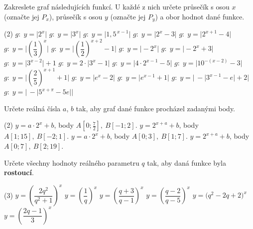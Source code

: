 \documentclass[12pt,a4paper]{article}
\begin{document}
\begin{exercise}

Zakreslete graf následujících funkcí. 
U každé z nich určete průsečík s osou $x$ (označte jej $P_{x}$),
průsečík s osou $y$ (označte jej $P_{y}$) a obor hodnot dané funkce.

\begin{tasks}(2)
    \task $g:\; y = \bigl|2^{x}\bigr|$
    \task $g:\; y = \bigl|3^{x}\bigr|$
    \task $g:\; y = \bigl|1{,}5^{\,x-1}\bigr|$
    \task $g:\; y = \bigl|2^{x} - 3\bigr|$
    \task $g:\; y = \bigl|2^{x+1} - 4\bigr|$
    \task $g:\; y = \biggl|\left(\dfrac{1}{3}\right)^{x}\biggr|$
    \task $g:\; y = \biggl|\left(\dfrac{1}{2}\right)^{x+2} - 1\biggr|$
    \task $g:\; y = \bigl|-2^{x}\bigr|$
    \task $g:\; y = \bigl|-2^{x} + 3\bigr|$
    \task $g:\; y = \bigl|3^{x-2}\bigr| + 1$
    \task $g:\; y = 2\cdot\bigl|3^{x} - 1\bigr|$
    \task $g:\; y = \bigl|4\cdot 2^{x-1} - 5\bigr|$
    \task $g:\; y = \biggl|10^{-(x-2)} - 3\biggr|$
    \task $g:\; y = \biggl|\left(\dfrac{2}{5}\right)^{x+1} + 1\biggr|$
    \task $g:\; y = \bigl|e^{x} - 2\bigr|$
    \task $g:\; y = \bigl|e^{x-1} + 1\bigr|$
    \task $g:\; y = \bigl|\,-\bigl|3^{x-1} - e\bigr| + 2\bigr|$
    \task $g:\; y = \bigl|\,-\bigl|5^{x+\pi} - 5e\bigr|\bigr|$
\end{tasks}
\end{exercise}


\begin{exercise}

Určete reálná čísla $a$, $b$ tak, aby graf dané funkce procházel zadanými body.

\begin{tasks}(2)
    \task $y = a \cdot 2^{x} + b$, body $A[0;\tfrac{7}{2}],\ B[-1;2]$.
    \task $y = 2^{x+a} + b$, body $A[1;15],\ B[-2;1]$.
    \task $y = a \cdot 2^{x} + b$, body $A[0;3],\ B[1;7]$.
    \task $y = 2^{x+a} + b$, body $A[0;7],\ B[2;19]$.
\end{tasks}
\end{exercise}


\begin{exercise}
Určete všechny hodnoty reálného parametru $q$ tak, aby daná funkce byla \textbf{rostoucí}.

\begin{tasks}(3)
    \task $y = \left(\dfrac{2q^{2}}{q^{2}+1}\right)^{x}$
    \task $y = \left(\dfrac{1}{q}\right)^{x}$
    \task $y = \left(\dfrac{q+3}{q-1}\right)^{x}$
    \task $y = \left(\dfrac{q-2}{q-5}\right)^{x}$
    \task $y = \bigl(q^{2}-2q+2\bigr)^{x}$
    \task $y = \left(\dfrac{2q-1}{3}\right)^{x}$
\end{tasks}
\end{exercise}
\end{document}
